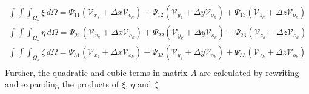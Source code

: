 \begin{equation}
    \label{eq:a15}
    \begin{gathered}
    \int\int\int_{\Omega_k}\xi\,d\Omega=\Psi_{11}(\mathcal{V}_{x_k}+\Delta x\mathcal{V}_{o_k})+\Psi_{12}(\mathcal{V}_{y_k}+\Delta y\mathcal{V}_{o_k})+\Psi_{13}(\mathcal{V}_{z_k}+\Delta z\mathcal{V}_{o_k})\\
    \int\int\int_{\Omega_k}\eta\,d\Omega=\Psi_{21}(\mathcal{V}_{x_k}+\Delta x\mathcal{V}_{o_k})+\Psi_{22}(\mathcal{V}_{y_k}+\Delta y\mathcal{V}_{o_k})+\Psi_{23}(\mathcal{V}_{z_k}+\Delta z\mathcal{V}_{o_k})\\
    \int\int\int_{\Omega_k}\zeta\,d\Omega=\Psi_{31}(\mathcal{V}_{x_k}+\Delta x\mathcal{V}_{o_k})+\Psi_{32}(\mathcal{V}_{y_k}+\Delta y\mathcal{V}_{o_k})+\Psi_{33}(\mathcal{V}_{z_k}+\Delta z\mathcal{V}_{o_k})\\
    \end{gathered}
\end{equation}
Further, the quadratic and cubic terms in matrix $A$ are calculated by rewriting and expanding the products of $\xi$, $\eta$ and $\zeta$.
